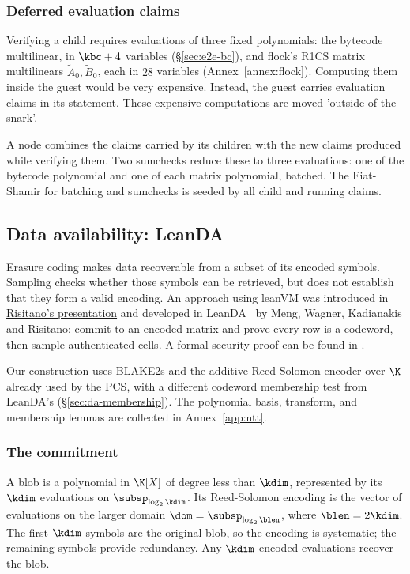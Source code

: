 \subsubsection{Deferred evaluation claims}\label{sec:deferred-claims}

Verifying a child requires evaluations of three fixed polynomials: the bytecode multilinear, in $\kbc+4$ variables (\S\ref{sec:e2e-bc}), and flock's R1CS matrix multilinears $\widetilde A_0,\widetilde B_0$, each in $28$ variables (Annex~\ref{annex:flock}). Computing them inside the guest would be very expensive. Instead, the guest carries evaluation claims in its statement. These expensive computations are moved 'outside of the snark'.

A node combines the claims carried by its children with the new claims produced while verifying them. Two sumchecks reduce these to three evaluations: one of the bytecode polynomial and one of each matrix polynomial, batched. The Fiat-Shamir for batching and sumchecks is seeded by all child and running claims.

\subsection{Data availability: LeanDA}\label{sec:leanda}

Erasure coding makes data recoverable from a subset of its encoded symbols. Sampling checks whether those symbols can be retrieved, but does not establish that they form a valid encoding. An approach using leanVM was introduced in \href{https://frisitano.github.io/slides/presentations/leanvm-fold-in-circuit-das-2026-05-08/index.html}{Risitano's presentation} and developed in LeanDA~\cite{LeanDA} by Meng, Wagner, Kadianakis and Risitano: commit to an encoded matrix and prove every row is a codeword, then sample authenticated cells. A formal security proof can be found in \cite{LeanDASecurity}.

Our construction uses BLAKE2s and the additive Reed-Solomon encoder over $\K$ already used by the PCS, with a different codeword membership test from LeanDA's (\S\ref{sec:da-membership}). The polynomial basis, transform, and membership lemmas are collected in Annex~\ref{app:ntt}.


\subsubsection{The commitment}\label{sec:da-commit}

A blob is a polynomial in $\K[X]$ of degree less than $\kdim$, represented by its $\kdim$ evaluations on $\subsp_{\log_2\kdim}$. Its Reed-Solomon encoding is the vector of evaluations on the larger domain $\dom=\subsp_{\log_2\blen}$, where $\blen=2\kdim$. The first $\kdim$ symbols are the original blob, so the encoding is systematic; the remaining symbols provide redundancy. Any $\kdim$ encoded evaluations recover the blob.

